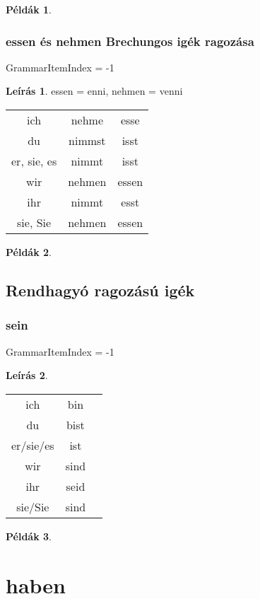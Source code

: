 \documentclass{article}
\theoremstyle{definition}
\newtheorem*{exmp}{Példák}
\newtheorem*{desc}{Leírás}
\begin{document}
\begin{exmp}
\end{exmp}

\subsubsection{essen és nehmen Brechungos igék ragozása}

GrammarItemIndex = -1

\begin{desc}
essen = enni, nehmen = venni

\begin{tabular}{ccc}
ich & nehme & esse \\
du & nimmst & isst \\
er, sie, es & nimmt & isst \\
wir & nehmen & essen \\
ihr & nimmt & esst \\
sie, Sie & nehmen & essen \\
\end{tabular}
\end{desc}

\begin{exmp}
\end{exmp}

\subsection{Rendhagyó ragozású igék}

\subsubsection{sein}

GrammarItemIndex = -1

\begin{desc}
\begin{tabular}{ccc}
 ich & bin \\
 du & bist \\
 er/sie/es & ist \\
 wir & sind \\
 ihr & seid \\
 sie/Sie & sind \\
\end{tabular}
\end{desc}

\begin{exmp}
\end{exmp}

\section{haben}
\end{document}
